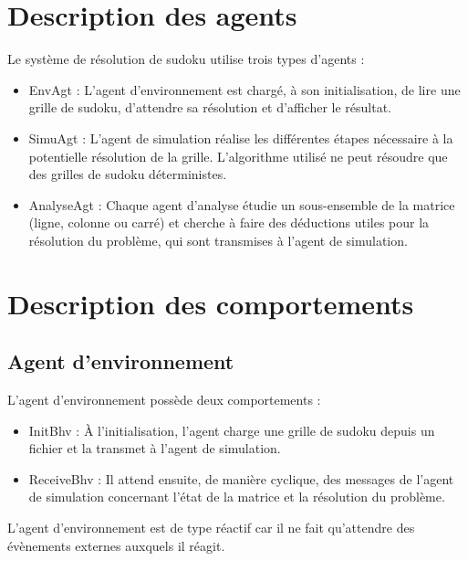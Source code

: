 \documentclass[a4paper,11pt]{article}
\begin{document}


\newpage
\section{Description des agents}
Le système de résolution de sudoku utilise trois types d'agents :
\begin{itemize}
\item EnvAgt : L'agent d'environnement est chargé, à son initialisation, de lire une grille de sudoku, d'attendre sa résolution et d'afficher le résultat.
\item SimuAgt : L'agent de simulation réalise les différentes étapes nécessaire à la potentielle résolution de la grille.
L'algorithme utilisé ne peut résoudre que des grilles de sudoku déterministes.
\item AnalyseAgt : Chaque agent d'analyse étudie un sous-ensemble de la matrice (ligne, colonne ou carré) et cherche à faire des déductions utiles pour la résolution du problème, qui sont transmises à l'agent de simulation. 
\end{itemize}

\section{Description des comportements}
\subsection{Agent d'environnement}
L'agent d'environnement possède deux comportements :
\begin{itemize}
\item InitBhv : À l'initialisation, l'agent charge une grille de sudoku depuis un fichier et la transmet à l'agent de simulation.
\item ReceiveBhv : Il attend ensuite, de manière cyclique, des messages de l'agent de simulation concernant l'état de la matrice et la résolution du problème. 
\end{itemize}
L'agent d'environnement est de type réactif car il ne fait qu'attendre des évènements externes auxquels il réagit.
\end{document}
